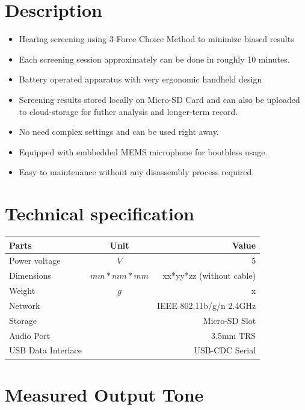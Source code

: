 \documentclass[a4paper,12pt,oneside,pdflatex,italian,final,twocolumn]{article}
\begin{document}
\section{Description}
\begin{itemize}

\item Hearing screening using 3-Force Choice Method to minimize biased results

\item Each screening session approximately can be done in roughly 10 minutes.

\item Battery operated apparatus with very ergonomic handheld design

\item Screening results stored locally on Micro-SD Card and can also be uploaded to cloud-storage for futher analysis and longer-term record.

\item No need complex settings and can be used right away.

\item Equipped with embbedded MEMS microphone for boothless usage.

\item Easy to maintenance without any disassembly process required.

\end{itemize}

\section{Technical specification}
\centering
\begin{tabular}{lcr}
\toprule
Parts & Unit & Value \\
\midrule
Power voltage & $V$ & 5 \\
Dimensions & $mm*mm*mm$ & xx*yy*zz (without cable) \\
Weight & $g$ & x \\
Network & & IEEE 802.11b/g/n 2.4GHz \\
Storage & & Micro-SD Slot \\
Audio Port & & 3.5mm TRS \\
USB  Data Interface & & USB-CDC Serial \\
\bottomrule
\end{tabular}

\raggedright

\section{Measured Output Tone}
\end{document}
